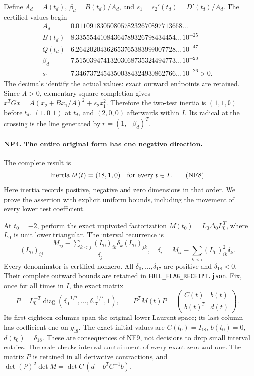 Define $A_d=A(t_d)$, $\beta_d=B(t_d)/A_d$, and
$s_1=s_2'(t_d)=D'(t_d)/A_d$. The certified values begin
\[
\begin{array}{c|l}
A_d&0.0110918305080578232670897713658\ldots\\
B(t_d)&8.33555441084364789326798434454\ldots\,10^{-25}\\
Q(t_d)&6.26420204362653765383999007728\ldots\,10^{-47}\\
\beta_d&7.51503947413203068735324494773\ldots\,10^{-23}\\
s_1&7.34673724543500384324930862766\ldots\,10^{-26}>0.
\end{array}\tag{NF7}
\]
The decimals identify the actual values; exact outward endpoints
are retained. Since $A>0$, elementary square completion gives
$x^TGx=A(x_2+Bx_1/A)^2+s_2x_1^2$. Therefore the two-test
inertia is $(1,1,0)$ before $t_d$, $(1,0,1)$ at $t_d$, and
$(2,0,0)$ afterwards within $I$. Its radical at the crossing is
the line generated by $r=(1,-\beta_d)^T$.

\paragraph{NF4. The entire original form has one negative direction.}
The complete result is
\[
 \operatorname{inertia}M(t)=(18,1,0)\quad\hbox{for every }t\in I.
 \tag{NF8}
\]
Here inertia records positive, negative and zero dimensions in
that order. We prove the assertion with explicit uniform bounds,
including the movement of every lower test coefficient.

At $t_0=-2$, perform the exact unpivoted factorization
$M(t_0)=L_0\Delta_0L_0^T$, where $L_0$ is unit lower triangular.
The interval recurrence is
\[
 (L_0)_{ij}=\frac{M_{ij}-\sum_{k<j}(L_0)_{ik}\delta_k(L_0)_{jk}}{\delta_j},
 \quad
 \delta_i=M_{ii}-\sum_{k<i}(L_0)_{ik}^2\delta_k.
 \tag{NF9}
\]
Every denominator is certified nonzero. All $\delta_0,\ldots,
\delta_{17}$ are positive and $\delta_{18}<0$. Their complete
outward bounds are retained in \texttt{FULL\_FLAG\_RECEIPT.json}.
Fix, once for all times in $I$, the exact matrix
\[
 P=L_0^{-T}\operatorname{diag}
 (\delta_0^{-1/2},\ldots,\delta_{17}^{-1/2},1),\qquad
 P^TM(t)P=\begin{pmatrix}C(t)&b(t)\\b(t)^T&d(t)\end{pmatrix}.
 \tag{NF10}
\]
Its first eighteen columns span the original lower Laurent space;
its last column has coefficient one on $g_{18}$. The exact initial
values are $C(t_0)=I_{18}$, $b(t_0)=0$, $d(t_0)=\delta_{18}$.
These are consequences of NF9, not decisions to drop small
interval entries. The code checks interval containment of every
exact zero and one. The matrix $P$ is retained in all derivative
contractions, and $\det(P)^2\det M=\det C\,(d-b^TC^{-1}b)$.

